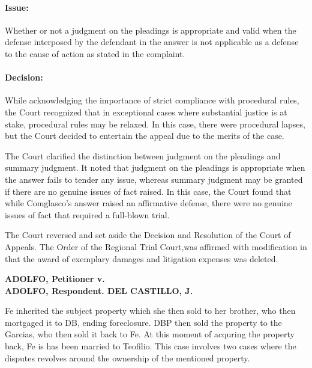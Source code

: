 \documentclass[
12pt,
oneside,
onehalfspacing,
headsepline
]{DigestCollection}
\begin{document}
\paragraph{Issue:}
\label{11e2ea10-121d-11ef-aa24-9916ea601717}


Whether or not a judgment on the pleadings is appropriate and valid when the defense interposed by the defendant in the answer is not applicable as a defense to the cause of action as stated in the complaint.

\paragraph{Decision:}
\label{100e7830-121d-11ef-aa24-9916ea601717}


While acknowledging the importance of strict compliance with procedural rules, the Court recognized that in exceptional cases where substantial justice is at stake, procedural rules may be relaxed. In this case, there were procedural lapses, but the Court decided to entertain the appeal due to the merits of the case.

The Court clarified the distinction between judgment on the pleadings and summary judgment. It noted that judgment on the pleadings is appropriate when the answer fails to tender any issue, whereas summary judgment may be granted if there are no genuine issues of fact raised. In this case, the Court found that while Comglasco's answer raised an affirmative defense, there were no genuine issues of fact that required a full-blown trial.

The Court reversed and set aside the Decision and Resolution of the Court of Appeals. The Order of the Regional Trial Court,was affirmed with modification in that the award of exemplary damages and litigation expenses was deleted. 

\label{5091d220-0a2b-11ef-a1a5-03b0bde1fccf}


\noindent\textbf{ADOLFO, Petitioner v. \\ADOLFO, Respondent. DEL CASTILLO, J.}\vspace{0.4cm}

Fe inherited the subject property which she then sold to her brother, who then mortgaged it to DB, ending foreclosure. DBP then sold the property to the Garcias, who then sold it back to Fe. At this moment of acquring the property back, Fe is has been married to Teofilio. This case involves two cases where the disputes revolves around the ownership of the mentioned property.
\end{document}
